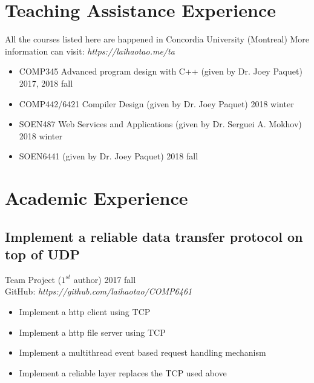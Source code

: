 \documentclass[11pt,a4paper,sans]{moderncv}
\begin{document}
\section{Teaching Assistance Experience}
All the courses listed here are happened in Concordia University (Montreal)
\newline More information can visit: {\textit{https://laihaotao.me/ta}}
\vspace{2pt}
\begin{itemize}
\item COMP345 Advanced program design with C++ (given by Dr. Joey Paquet) \hfill 2017, 2018 fall
\vspace{1pt}

\item COMP442/6421 Compiler Design (given by Dr. Joey Paquet) \hfill 2018 winter
\vspace{1pt}

\item SOEN487 Web Services and Applications (given by Dr. Serguei A. Mokhov) \hfill 2018 winter
\vspace{1pt}

\item SOEN6441 (given by Dr. Joey Paquet) \hfill 2018 fall
\vspace{1pt}
\end{itemize}

\section{Academic Experience}

\subsection{Implement a reliable data transfer protocol on top of UDP}
Team Project ($1^{st}$ author) \hfill 2017 fall \\
GitHub: {\textit{https://github.com/laihaotao/COMP6461}}
\vspace{2pt}
\begin{itemize}
\item Implement a http client using TCP
\item Implement a http file server using TCP
\item Implement a multithread event based request handling mechanism
\item Implement a reliable layer replaces the TCP used above
\end{itemize}
\end{document}
